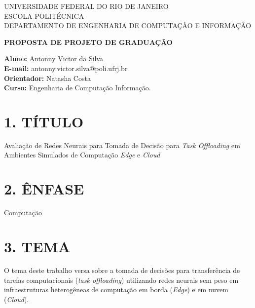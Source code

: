 \documentclass[12pt,a4paper]{article}
\begin{document}
\begin{center}
    \large
    UNIVERSIDADE FEDERAL DO RIO DE JANEIRO \\
    ESCOLA POLITÉCNICA \\
    DEPARTAMENTO DE ENGENHARIA DE COMPUTAÇÃO E INFORMAÇÃO
\end{center}

\vspace{2cm}

\begin{center}
    \Large\bfseries
    PROPOSTA DE PROJETO DE GRADUAÇÃO
\end{center}


\begin{center}
\noindent \textbf{Aluno:} Antonny Victor da Silva \\
\textbf{E-mail:} antonny.victor.silva@poli.ufrj.br\\
\textbf{Orientador:} Natasha Costa \\
\textbf{Curso:} Engenharia de Computação Informação.
\end{center}



\section*{\bfseries 1. TÍTULO}
Avaliação de Redes Neurais para Tomada de Decisão para \textit{Task Offloading} em Ambientes Simulados de Computação \textit{Edge} e \textit{Cloud}

\section*{\bfseries 2. ÊNFASE}
Computação


\section*{\bfseries 3. TEMA}
O tema deste trabalho versa sobre a tomada de decisões para transferência de
tarefas computacionais (\textit{task offloading}) utilizando redes neurais sem peso em infraestruturas heterogêneas de computação em borda
(\textit{Edge}) e em nuvem (\textit{Cloud}).
\end{document}
